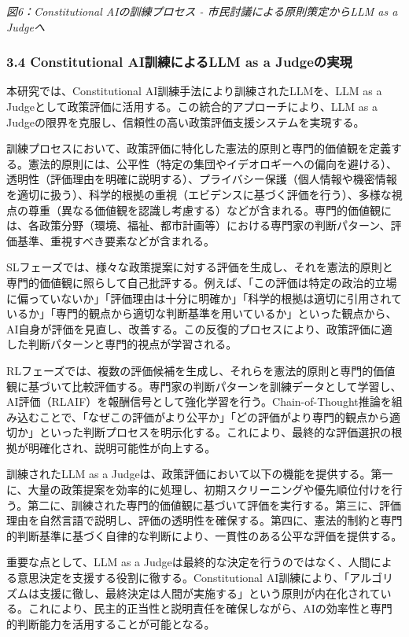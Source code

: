 \pandocbounded{}
\emph{図6：Constitutional AIの訓練プロセス - 市民討議による原則策定からLLM as a Judgeへ}

\subsubsection{3.4 Constitutional AI訓練によるLLM as a Judgeの実現}\label{constitutional-aiux8a13ux7df4ux306bux3088ux308bllm-as-a-judgeux306eux5b9fux73fe}

本研究では、Constitutional AI訓練手法により訓練されたLLMを、LLM as a Judgeとして政策評価に活用する。この統合的アプローチにより、LLM as a Judgeの限界を克服し、信頼性の高い政策評価支援システムを実現する。

訓練プロセスにおいて、政策評価に特化した憲法的原則と専門的価値観を定義する。憲法的原則には、公平性（特定の集団やイデオロギーへの偏向を避ける）、透明性（評価理由を明確に説明する）、プライバシー保護（個人情報や機密情報を適切に扱う）、科学的根拠の重視（エビデンスに基づく評価を行う）、多様な視点の尊重（異なる価値観を認識し考慮する）などが含まれる。専門的価値観には、各政策分野（環境、福祉、都市計画等）における専門家の判断パターン、評価基準、重視すべき要素などが含まれる。

SLフェーズでは、様々な政策提案に対する評価を生成し、それを憲法的原則と専門的価値観に照らして自己批評する。例えば、「この評価は特定の政治的立場に偏っていないか」「評価理由は十分に明確か」「科学的根拠は適切に引用されているか」「専門的観点から適切な判断基準を用いているか」といった観点から、AI自身が評価を見直し、改善する。この反復的プロセスにより、政策評価に適した判断パターンと専門的視点が学習される。

RLフェーズでは、複数の評価候補を生成し、それらを憲法的原則と専門的価値観に基づいて比較評価する。専門家の判断パターンを訓練データとして学習し、AI評価（RLAIF）を報酬信号として強化学習を行う。Chain-of-Thought推論を組み込むことで、「なぜこの評価がより公平か」「どの評価がより専門的観点から適切か」といった判断プロセスを明示化する。これにより、最終的な評価選択の根拠が明確化され、説明可能性が向上する。

訓練されたLLM as a Judgeは、政策評価において以下の機能を提供する。第一に、大量の政策提案を効率的に処理し、初期スクリーニングや優先順位付けを行う。第二に、訓練された専門的価値観に基づいて評価を実行する。第三に、評価理由を自然言語で説明し、評価の透明性を確保する。第四に、憲法的制約と専門的判断基準に基づく自律的な判断により、一貫性のある公平な評価を提供する。

重要な点として、LLM as a Judgeは最終的な決定を行うのではなく、人間による意思決定を支援する役割に徹する。Constitutional AI訓練により、「アルゴリズムは支援に徹し、最終決定は人間が実施する」という原則が内在化されている。これにより、民主的正当性と説明責任を確保しながら、AIの効率性と専門的判断能力を活用することが可能となる。


